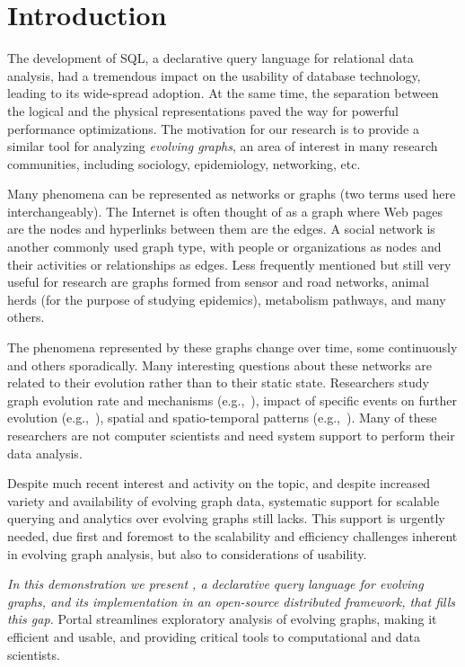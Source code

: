 \section{Introduction}
\label{sec:intro}

The development of SQL, a declarative query language for relational
data analysis, had a tremendous impact on the usability of database
technology, leading to its wide-spread adoption.  At the same time,
the separation between the logical and the physical representations
paved the way for powerful performance optimizations.  The motivation
for our research is to provide a similar tool for analyzing {\em
  evolving graphs}, an area of interest in many research communities,
including sociology, epidemiology, networking, etc.

Many phenomena can be represented as networks or graphs (two terms
used here interchangeably).  The Internet is often thought of as a
graph where Web pages are the nodes and hyperlinks between them are
the edges.  A social network is another commonly used graph type, with
people or organizations as nodes and their activities or relationships
as edges.  Less frequently mentioned but still very useful for
research are graphs formed from sensor and road networks, animal herds
(for the purpose of studying epidemics), metabolism pathways, and many
others.

The phenomena represented by these graphs change over time, some
continuously and others sporadically.  Many interesting questions
about these networks are related to their evolution rather than to
their static state.  Researchers study graph evolution rate and
mechanisms (e.g.,~\cite{DBLP:journals/csur/AggarwalS14,Cho2000}),
impact of specific events on further evolution
(e.g.,~\cite{Chan2008}), spatial and spatio-temporal patterns
(e.g.,~\cite{Lahiri2008}).  Many of these researchers are not computer
scientists and need system support to perform their data analysis.

Despite much recent interest and activity on the topic, and despite
increased variety and availability of evolving graph data, systematic
support for scalable querying and analytics over evolving graphs still
lacks. This support is urgently needed, due first and foremost to the
scalability and efficiency challenges inherent in evolving graph
analysis, but also to considerations of usability.

{\em In this demonstration we present \ql, a declarative query
  language for evolving graphs, and its implementation in an
  open-source distributed framework, that fills this gap.} Portal
streamlines exploratory analysis of evolving graphs, making it
efficient and usable, and providing critical tools to computational
and data scientists.

